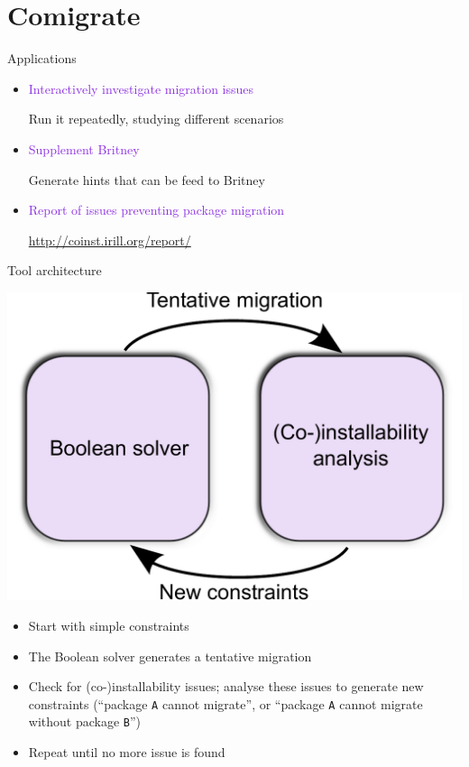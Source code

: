 \documentclass[xcolor={dvipsnames}]{beamer}
\newcommand{\EEE}[1]{\textcolor{BlueViolet}{#1}}
\begin{document}
\part{Comigrate}
\frame{\partpage}

\begin{frame}{Applications}

\begin{itemize}
\item \EEE{Interactively investigate migration issues}

Run it repeatedly, studying different scenarios

\vspace{0.5em}

\item \EEE{Supplement Britney}

Generate hints that can be feed to Britney

\vspace{0.5em}

\item \EEE{Report of issues preventing package migration}

\url{http://coinst.irill.org/report/}

\end{itemize}
\end{frame}

\begin{frame}{Tool architecture}

\vspace{-1em}
\begin{center}
\includegraphics[width=0.5\linewidth]{figures/architecture}
\end{center}

\vspace{-1em}

\begin{itemize}
\item Start with simple constraints
\item The Boolean solver generates a tentative migration
\item 
 Check for (co-)installability issues;
  analyse these issues to generate new constraints
  (``package \texttt{A} cannot migrate'',
  or ``package \texttt{A} cannot migrate without package \texttt{B}'')
\item Repeat until no more issue is found
\end{itemize}
\end{frame}
\end{document}
